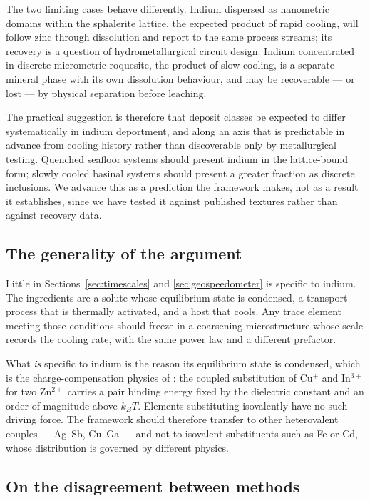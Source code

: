 \documentclass[11pt,a4paper]{article}
\begin{document}
The two limiting cases behave differently. Indium dispersed as nanometric
domains within the sphalerite lattice, the expected product of rapid cooling,
will follow zinc through dissolution and report to the same process streams;
its recovery is a question of hydrometallurgical circuit design. Indium
concentrated in discrete micrometric roquesite, the product of slow cooling,
is a separate mineral phase with its own dissolution behaviour, and may be
recoverable --- or lost --- by physical separation before leaching.

The practical suggestion is therefore that deposit classes be expected to
differ systematically in indium deportment, and along an axis that is
predictable in advance from cooling history rather than discoverable only by
metallurgical testing. Quenched seafloor systems should present indium in the
lattice-bound form; slowly cooled basinal systems should present a greater
fraction as discrete inclusions. We advance this as a prediction the framework
makes, not as a result it establishes, since we have tested it against
published textures rather than against recovery data.

\subsection{The generality of the argument}

Little in Sections~\ref{sec:timescales} and \ref{sec:geospeedometer} is specific
to indium. The ingredients are a solute whose equilibrium state is condensed, a
transport process that is thermally activated, and a host that cools. Any
trace element meeting those conditions should freeze in a coarsening
microstructure whose scale records the cooling rate, with the same power law and
a different prefactor.

What \emph{is} specific to indium is the reason its equilibrium state is
condensed, which is the charge-compensation physics of \citet{yu2026}: the
coupled substitution of Cu$^+$ and In$^{3+}$ for two Zn$^{2+}$ carries a pair
binding energy fixed by the dielectric constant and an order of magnitude above
$k_BT$. Elements substituting isovalently have no such driving force. The
framework should therefore transfer to other heterovalent couples --- Ag--Sb,
Cu--Ga --- and not to isovalent substituents such as Fe or Cd, whose
distribution is governed by different physics.

\subsection{On the disagreement between methods}
\end{document}
